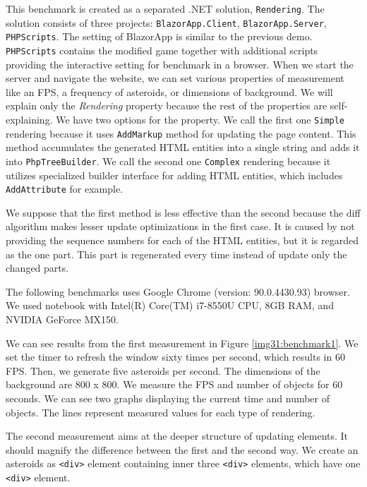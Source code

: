 \par
This benchmark is created as a separated .NET solution, \texttt{Rendering}.
The solution consists of three projects: \texttt{BlazorApp.Client}, \texttt{BlazorApp.Server}, \texttt{PHPScripts}.
The setting of BlazorApp is similar to the previous demo.
\texttt{PHPScripts} contains the modified game together with additional scripts providing the interactive setting for benchmark in a browser.
When we start the server and navigate the website, we can set various properties of measurement like an FPS, a frequency of asteroids, or dimensions of background.
We will explain only the \textit{Rendering} property because the rest of the properties are self-explaining.
We have two options for the property.
We call the first one \texttt{Simple} rendering because it uses \texttt{AddMarkup} method for updating the page content.
This method accumulates the generated HTML entities into a single string and adds it into \texttt{PhpTreeBuilder}.
We call the second one \texttt{Complex} rendering because it utilizes specialized builder interface for adding HTML entities, which includes \texttt{AddAttribute} for example.
\par
We suppose that the first method is less effective than the second because the diff algorithm makes lesser update optimizations in the first case.
It is caused by not providing the sequence numbers for each of the HTML entities, but it is regarded as the one part.
This part is regenerated every time instead of update only the changed parts.
\par
\par
The following benchmarks uses Google Chrome (version: 90.0.4430.93) browser.
We used notebook with Intel(R) Core(TM) i7-8550U CPU, 8GB RAM, and NVIDIA GeForce MX150.
\par
We can see results from the first measurement in Figure \ref{img31:benchmark1}.
We set the timer to refresh the window sixty times per second, which results in 60 FPS.
Then, we generate five asteroids per second.
The dimensions of the background are 800 x 800.
We measure the FPS and number of objects for 60 seconds.
We can see two graphs displaying the current time and number of objects.
The lines represent measured values for each type of rendering.
\par
The second measurement aims at the deeper structure of updating elements. 
It should magnify the difference between the first and the second way.
We create an asteroids as \texttt{<div>} element containing inner three \texttt{<div>} elements, which have one \texttt{<div>} element.
